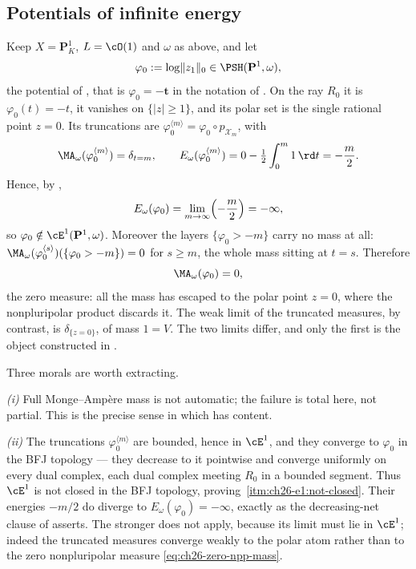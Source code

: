 \subsection{Potentials of infinite energy}
\label{sec:ch26-ex-infinite}

\begin{example}
\label{ex:ch26-infinite-energy}
Keep $X=\mathbf P^1_K$, $L=\cO(1)$ and $\omega$ as above, and let
\[
 \varphi_0:=\log\lVert z_1\rVert_0\in\PSH(\mathbf P^1,\omega),
\]
the potential of , that is
$\varphi_0=-\mathbf t$ in the notation of
.  On the ray $R_0$ it is
$\varphi_0(t)=-t$, it vanishes on $\{|z|\geq1\}$, and its polar set is
the single rational point $z=0$.  Its truncations are
$\varphi_0^{\langle m\rangle}=\varphi_0\circ p_{\mathcal X_m}$, with
\[
 \MA_\omega(\varphi_0^{\langle m\rangle})=\delta_{t=m},
 \qquad
 E_\omega(\varphi_0^{\langle m\rangle})
 =0-\tfrac12\int_0^m1\,\rd t=-\frac m2 .
\]
Hence, by ,
\begin{equation}
\label{eq:ch26-infinite-energy}
 E_\omega(\varphi_0)=\lim_{m\to\infty}\Bigl(-\frac m2\Bigr)=-\infty,
\end{equation}
so $\varphi_0\notin\cE^1(\mathbf P^1,\omega)$.  Moreover the layers
$\{\varphi_0>-m\}$ carry no mass at all:
$\MA_\omega(\varphi_0^{\langle s\rangle})(\{\varphi_0>-m\})=0$ for
$s\geq m$, the whole mass sitting at $t=s$.  Therefore
\begin{equation}
\label{eq:ch26-zero-npp-mass}
 \MA_\omega(\varphi_0)=0,
\end{equation}
the zero measure: all the mass has escaped to the polar point $z=0$, where
the nonpluripolar product discards it.  The weak limit of the truncated
measures, by contrast, is $\delta_{\{z=0\}}$, of mass $1=V$.  The two
limits differ, and only the first is the object constructed in
.

Three morals are worth extracting.

\emph{(i)}  Full Monge--Amp\`ere mass is not automatic; the failure is total
here, not partial.  This is the precise sense in which
 has content.

\emph{(ii)}  The truncations $\varphi_0^{\langle m\rangle}$ are bounded,
hence in $\cE^1$, and they converge to $\varphi_0$ in the BFJ topology
--- they decrease to it pointwise and converge uniformly on every dual
complex, each dual complex meeting $R_0$ in a bounded segment.  Thus
$\cE^1$ is not closed in the BFJ topology, proving
\,\cref{itm:ch26-e1:not-closed}.  Their energies
$-m/2$ do diverge to $E_\omega(\varphi_0)=-\infty$, exactly as the
decreasing-net clause of  asserts.  The
stronger  does not apply, because its limit
must lie in $\cE^1$; indeed the truncated measures converge weakly to the
polar atom rather than to the zero nonpluripolar measure
\eqref{eq:ch26-zero-npp-mass}.


\end{example}

